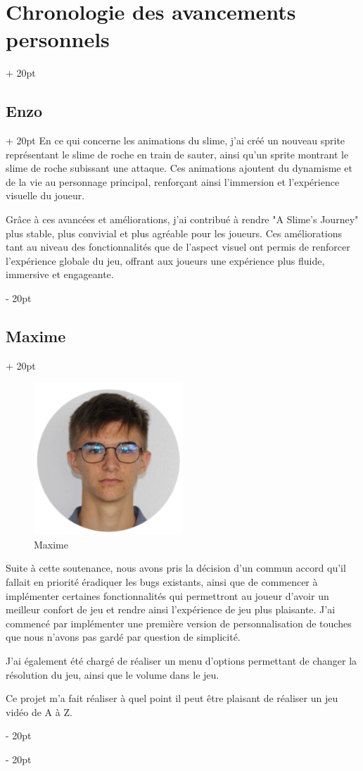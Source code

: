 \documentclass[a4paper, 12pt, twoside]{article}
\newcommand{\ind}[1][20pt]{\advance\leftskip + #1}
\newcommand{\deind}[1][20pt]{\advance\leftskip - #1}
\newenvironment{indt}[2][20pt]{#2 \par \ind[#1]}{\par \deind} %
\begin{document}
\begin{indt}{\section{Chronologie des avancements personnels}}
\begin{indt}{\subsection{Enzo}}
            En ce qui concerne les animations du slime, j'ai créé un nouveau sprite représentant le slime de roche en train de sauter, ainsi qu'un sprite montrant le slime de roche subissant une attaque. Ces animations ajoutent du dynamisme et de la vie au personnage principal, renforçant ainsi l'immersion et l'expérience visuelle du joueur.

            Grâce à ces avancées et améliorations, j'ai contribué à rendre "A Slime's Journey" plus stable, plus convivial et plus agréable pour les joueurs. Ces améliorations tant au niveau des fonctionnalités que de l'aspect visuel ont permis de renforcer l'expérience globale du jeu, offrant aux joueurs une expérience plus fluide, immersive et engageante.

        \end{indt}

        \begin{indt}{\subsection{Maxime}}
            \begin{figure}[h]
                \centering
                \includegraphics[width=0.5\textwidth]{maxime.png}
                \caption{Maxime}
                \label{fig:mesh1}
            \end{figure}

            Suite à cette soutenance, nous avons pris la décision d’un commun accord qu’il fallait en priorité éradiquer les bugs existants, ainsi que de commencer à implémenter certaines fonctionnalités qui permettront au joueur d’avoir un meilleur confort de jeu et rendre ainsi l’expérience de jeu plus plaisante. J’ai commencé par implémenter une première version de personnalisation de touches que nous n’avons pas gardé par question de simplicité.

            J’ai également été chargé de réaliser un menu d’options permettant de changer la résolution du jeu, ainsi que le volume dans le jeu.

            Ce projet m’a fait réaliser à quel point il peut être plaisant de réaliser un jeu vidéo de A à Z.
        \end{indt}
    \end{indt}
\end{document}
